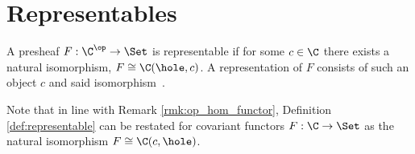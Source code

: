 \section{Representables}

\begin{definition}\label{def:representable}
  A presheaf $F: \C^\op\to \Set$ is representable if for some $c\in\C$ there
  exists a natural isomorphism, $F \cong \C(\hole, c)$. A representation of $F$
  consists of such an object $c$ and said
  isomorphism~\parencite[p.~84]{leinster:basic_category_theory}.
\end{definition}

\begin{remark}
  Note that in line with Remark \ref{rmk:op_hom_functor}, Definition
  \ref{def:representable} can be restated for covariant functors $F:\C\to\Set$ as the natural isomorphism $F\cong \C(c, \hole)$.
\end{remark}